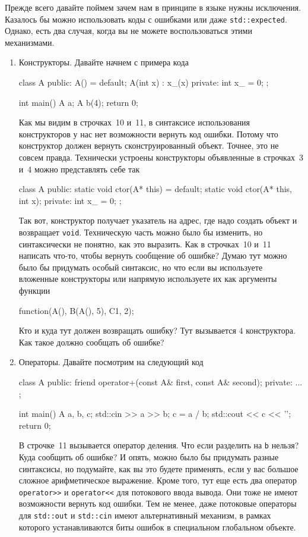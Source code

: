 Прежде всего давайте поймем зачем нам в принципе в языке нужны исключения.
Казалось бы можно использовать коды с ошибками или даже \verb"std::expected".
Однако, есть два случая, когда вы не можете воспользоваться этими механизмами.
\begin{enumerate}
\item Конструкторы.
Давайте начнем с примера кода
\begin{cppcode}
class A {
public:
  A() = default;
  A(int x) : x_(x) {}
private:
  int x_ = 0;
};

int main() {
  A a;
  A b(4);
  return 0;
}
\end{cppcode}
Как мы видим в строчках~10 и~11, в синтаксисе использования конструкторов у нас нет возможности вернуть код ошибки.
Потому что конструктор должен вернуть сконструированный объект.
Точнее, это не совсем правда.
Технически устроены конструкторы объявленные в строчках~3 и~4 можно представлять себе так
\begin{cppcode}
class A {
public:
  static void ctor(A* this) = default;
  static void ctor(A* this, int x);
private:
  int x_ = 0;
};
\end{cppcode}
Так вот, конструктор получает указатель на адрес, где надо создать объект и возвращает \verb"void".
Техническую часть можно было бы изменить, но синтаксически не понятно, как это выразить.
Как в строчках~10 и~11 написать что-то, чтобы вернуть сообщение об ошибке?
Думаю тут можно было бы придумать особый синтаксис, но что если вы используете вложенные конструкторы или напрямую используете их как аргументы функции
\begin{cppcode}
function(A(), B(A(), 5), C{1, 2});
\end{cppcode}
Кто и куда тут должен возвращать ошибку?
Тут вызывается $4$ конструктора.
Как такое должно сообщать об ошибке?

\item Операторы.
Давайте посмотрим на следующий код
\begin{cppcode}
class A {
public:
  friend operator+(const A& first, const A& second);
private:
  ...
};

int main() {
  A a, b, c;
  std::cin >> a >> b;
  c = a / b;
  std::cout << c << '\n';
  return 0;
}
\end{cppcode}
В строчке~11 вызывается оператор деления.
Что если разделить на \verb"b" нельзя?
Куда сообщить об ошибке?
И опять, можно было бы придумать разные синтаксисы, но подумайте, как вы это будете применять, если у вас большое сложное арифметическое выражение.
Кроме того, тут еще есть два оператор \verb"operator>>" и \verb"operator<<" для потокового ввода вывода.
Они тоже не имеют возможности вернуть код ошибки.
Тем не менее, даже потоковые операторы для \verb"std::out" и \verb"std::cin" имеют альтернативный механизм, в рамках которого устанавливаются биты ошибок в специальном глобальном объекте.
\end{enumerate}

